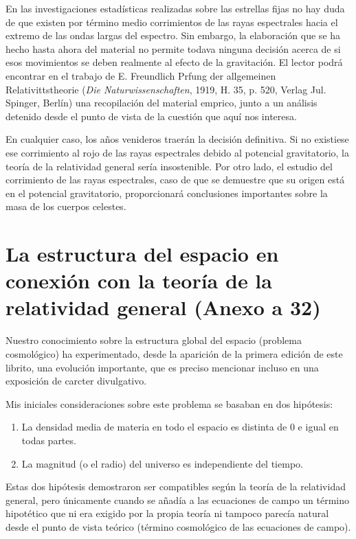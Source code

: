 \documentclass[spanish]{book}
\begin{document}
En las investigaciones estadísticas realizadas sobre las estrellas fijas no hay duda de que
existen por término medio corrimientos de las rayas espectrales hacia el extremo de las
ondas largas del espectro. Sin embargo, la elaboración que se ha hecho hasta ahora del
material no permite todava ninguna decisión acerca de si esos movimientos se deben
realmente al efecto de la gravitación. El lector podrá encontrar en el trabajo de E.
Freundlich Prfung der allgemeinen Relativittstheorie (\textit{Die Naturwissenschaften},
1919, H. 35, p. 520, Verlag Jul. Spinger, Berlín) una recopilación del material
emprico, junto a un análisis detenido desde el punto de vista de la cuestión que
aquí nos interesa.

En cualquier caso, los años venideros traerán la decisión definitiva. Si no
existiese ese corrimiento al rojo de las rayas espectrales debido al potencial
gravitatorio, la teoría de la relatividad general sería insostenible. Por otro lado, el
estudio del corrimiento de las rayas espectrales, caso de que se demuestre que su
origen está en el potencial gravitatorio, proporcionará conclusiones importantes sobre
la masa de los cuerpos celestes.


\chapter{La estructura del espacio en conexión con la teoría de la relatividad
general (Anexo a 32)}

Nuestro conocimiento sobre la estructura global del espacio (problema
cosmológico) ha experimentado, desde la aparición de la primera edición de este
librito, una evolución importante, que es preciso mencionar incluso en una exposición
de carcter divulgativo.

Mis iniciales consideraciones sobre este problema se basaban en dos hipótesis:
\begin{enumerate}
\item La densidad media de materia en todo el espacio
es distinta de 0 e igual en todas partes.
\item La magnitud (o el radio) del universo es independiente del tiempo.
\end{enumerate}

Estas dos hipótesis demostraron ser compatibles según la teoría de la relatividad
general, pero únicamente cuando se añadía a las ecuaciones de campo un término
hipotético que ni era exigido por la propia teoría ni tampoco parecía natural desde el
punto de vista teórico (término cosmológico de las ecuaciones de campo).
\end{document}
